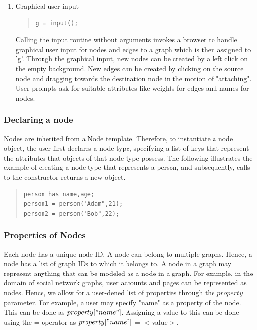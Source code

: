 \documentclass[a4paper]{article}
\begin{document}
\begin{enumerate}
\item Graphical user input
\begin{quote}
\begin{verbatim}
g = input();
\end{verbatim}
\end{quote}
\noindent Calling the input routine without arguments invokes a browser to handle graphical user input for nodes and edges to a graph which is then assigned to 'g'. Through the graphical input, new nodes can be created by a left click on the empty background. \newline New edges can be created by clicking on the source node and dragging towards the destination node in the motion of "attaching".
User prompts ask for suitable attributes like weights for edges and names for nodes.
\end{enumerate}

\subsubsection{Declaring a node}
\noindent Nodes are inherited from a Node template. Therefore, to instantiate a node object, the user first declares a node type, specifying a list of keys that represent the attributes that objects of that node type possess. 
The following illustrates the example of creating a node type that represents a person, and subsequently, calls to the constructor returns a new object.
\begin{quote}
\begin{verbatim}
person has name,age;
person1 = person("Adam",21);
person2 = person("Bob",22);
\end{verbatim}
\end{quote}

\subsubsection{Properties of Nodes}
\noindent Each node has a unique node ID. A node can belong to multiple graphs. Hence, a node has a list of graph IDs to which it belongs to. A node in a graph may represent anything that can be modeled as a node in a graph. For example, in the domain of social network graphs, user accounts and pages can be represented as nodes. Hence, we allow for a user-dened list of properties through the $property$ parameter. For example, a user may specify "name" as a property of the node. This can be done as $property["name"]$. Assigning a value to this can be done using the = operator as $property["name"]$ = $<$value$>$.
\end{document}
